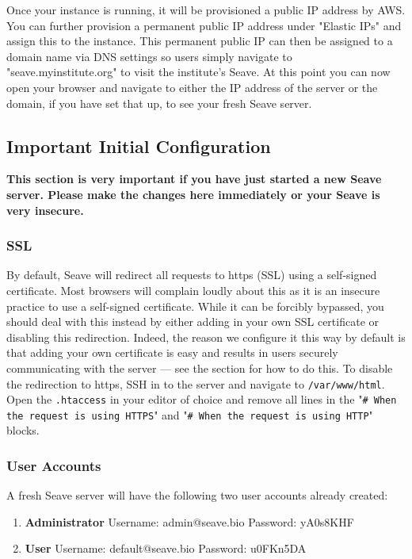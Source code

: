 \documentclass[11pt, a4paper]{article}
\begin{document}
Once your instance is running, it will be provisioned a public IP address by AWS. You can further provision a permanent public IP address under "Elastic IPs" and assign this to the instance. This permanent public IP can then be assigned to a domain name via DNS settings so users simply navigate to "seave.myinstitute.org" to visit the institute's Seave. At this point you can now open your browser and navigate to either the IP address of the server or the domain, if you have set that up, to see your fresh Seave server.


\subsection{Important Initial Configuration}\label{initialConfiguration}

{\large\textbf{\color{red}This section is very important if you have just started a new Seave server. Please make the changes here immediately or your Seave is very insecure.}}

\subsubsection{SSL}

By default, Seave will redirect all requests to https (SSL) using a self-signed certificate. Most browsers will complain loudly about this as it is an insecure practice to use a self-signed certificate. While it can be forcibly bypassed, you should deal with this instead by either adding in your own SSL certificate or disabling this redirection. Indeed, the reason we configure it this way by default is that adding your own certificate is easy and results in users securely communicating with the server --- see the  section for how to do this. To disable the redirection to https, SSH in to the server and navigate to \texttt{/var/www/html}. Open the \texttt{.htaccess} in your editor of choice and remove all lines in the "\texttt{\# When the request is using HTTPS}" and "\texttt{\# When the request is using HTTP}" blocks.

\subsubsection{User Accounts}

A fresh Seave server will have the following two user accounts already created:
\begin{enumerate}
	\item \textbf{Administrator} Username: admin@seave.bio Password: yA0s8KHF
	\item \textbf{User} Username: default@seave.bio Password: u0FKn5DA
\end{enumerate}
\end{document}
